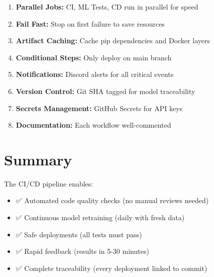 \begin{enumerate}
    \item \textbf{Parallel Jobs:} CI, ML Tests, CD run in parallel for speed
    \item \textbf{Fail Fast:} Stop on first failure to save resources
    \item \textbf{Artifact Caching:} Cache pip dependencies and Docker layers
    \item \textbf{Conditional Steps:} Only deploy on main branch
    \item \textbf{Notifications:} Discord alerts for all critical events
    \item \textbf{Version Control:} Git SHA tagged for model traceability
    \item \textbf{Secrets Management:} GitHub Secrets for API keys
    \item \textbf{Documentation:} Each workflow well-commented
\end{enumerate}

\section{Summary}

The CI/CD pipeline enables:
\begin{itemize}
    \item ✅ Automated code quality checks (no manual reviews needed)
    \item ✅ Continuous model retraining (daily with fresh data)
    \item ✅ Safe deployments (all tests must pass)
    \item ✅ Rapid feedback (results in 5-30 minutes)
    \item ✅ Complete traceability (every deployment linked to commit)
\end{itemize}

